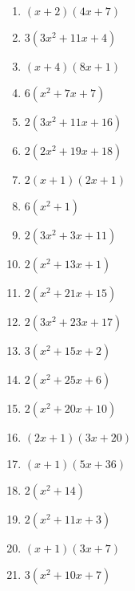 \documentclass[9pt,dvipdfmx,a4paper]{article}
\begin{document}
\begin{multicols}{2}
\begin{enumerate}
\item
$ \left(x + 2\right) \left(4 x + 7\right)$

\item
$ 3 \left(3 x^{2} + 11 x + 4\right)$

\item
$ \left(x + 4\right) \left(8 x + 1\right)$

\item
$ 6 \left(x^{2} + 7 x + 7\right)$

\item
$ 2 \left(3 x^{2} + 11 x + 16\right)$

\item
$ 2 \left(2 x^{2} + 19 x + 18\right)$

\item
$ 2 \left(x + 1\right) \left(2 x + 1\right)$

\item
$ 6 \left(x^{2} + 1\right)$

\item
$ 2 \left(3 x^{2} + 3 x + 11\right)$

\item
$ 2 \left(x^{2} + 13 x + 1\right)$

\item
$ 2 \left(x^{2} + 21 x + 15\right)$

\item
$ 2 \left(3 x^{2} + 23 x + 17\right)$

\item
$ 3 \left(x^{2} + 15 x + 2\right)$

\item
$ 2 \left(x^{2} + 25 x + 6\right)$

\item
$ 2 \left(x^{2} + 20 x + 10\right)$

\item
$ \left(2 x + 1\right) \left(3 x + 20\right)$

\item
$ \left(x + 1\right) \left(5 x + 36\right)$

\item
$ 2 \left(x^{2} + 14\right)$

\item
$ 2 \left(x^{2} + 11 x + 3\right)$

\item
$ \left(x + 1\right) \left(3 x + 7\right)$

\item
$ 3 \left(x^{2} + 10 x + 7\right)$


\end{enumerate}
\end{multicols}
\end{document}
